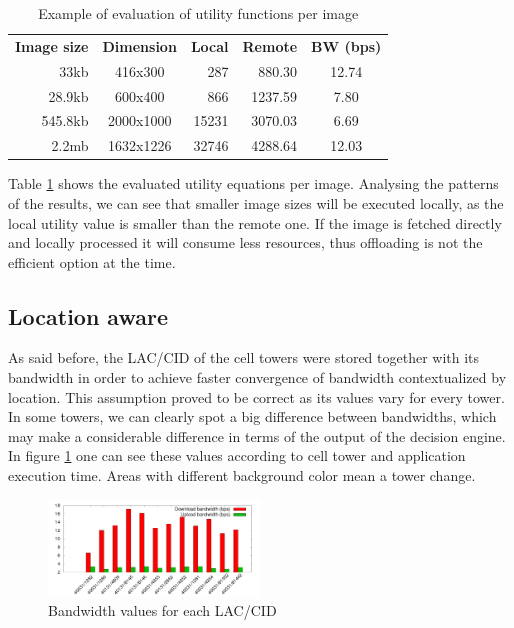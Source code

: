 \documentclass[10pt, conference, letterpaper]{IEEEtran}
\begin{document}
  \begin{table}[!t]
  \centering
  \caption{Example of evaluation of utility functions per image}
  \label{table:utility}
  \begin{tabular}{rcrrc}
    \textbf{Image size} & \textbf{Dimension} & \textbf{Local} & \textbf{Remote} & \textbf{BW (bps)} \\
   33kb & 416x300 & 287 & 880.30 & 12.74 \\
   28.9kb & 600x400  & 866 & 1237.59 & 7.80 \\
   545.8kb & 2000x1000  & 15231 & 3070.03 & 6.69 \\
   2.2mb & 1632x1226  & 32746 & 4288.64 & 12.03 \\
  \end{tabular}
  \end{table}

  Table \ref{table:utility} shows the evaluated utility equations per image. Analysing the patterns of the results, we can see that smaller image sizes will be executed locally, as the local utility value is smaller than the remote one. If the image is fetched directly and locally processed it will consume less resources, thus offloading is not the efficient option at the time. 

  \subsection{Location aware}
  As said before, the LAC/CID of the cell towers were stored together with its bandwidth in order to achieve faster convergence of bandwidth contextualized by location. This assumption proved to be correct as its values vary for every tower. In some towers, we can clearly spot a big difference between bandwidths, which may make a considerable difference in terms of the output of the decision engine. In figure \ref{fig:bwtime} one can see these values according to cell tower and application execution time. Areas with different background color mean a tower change.

\begin{figure}[!b]
  \centering
  \includegraphics[width=0.5\textwidth]{results/plots/laccid-bw/bars.png}
  \caption{Bandwidth values for each LAC/CID}
  \label{fig:bwtime}
\end{figure}
\end{document}
